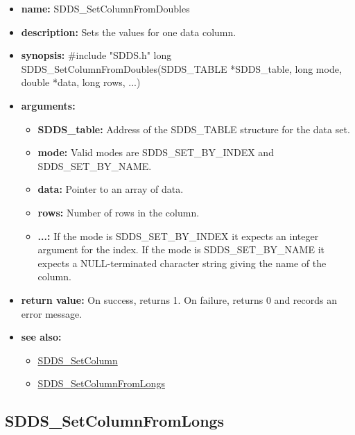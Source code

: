 \documentclass[11pt]{article}
\newcommand{\progref}[1]{\hyperref{SDDS_#1}{{\tt SDDS\_#1} (}{)}{SDDS_#1}}
\begin{document}
\begin{itemize}
\item {\bf name:}\newline
SDDS\_SetColumnFromDoubles
\item {\bf description:}\newline
Sets the values for one data column.
\item {\bf synopsis:} \#include "SDDS.h"\newline
long SDDS\_SetColumnFromDoubles(SDDS\_TABLE *SDDS\_table, long mode, double *data, long rows, ...)
\item {\bf arguments:}
\begin{itemize}
\item {\bf SDDS\_table:} Address of the SDDS\_TABLE structure for the data set.
\item {\bf mode:} Valid modes are SDDS\_SET\_BY\_INDEX and SDDS\_SET\_BY\_NAME.
\item {\bf data:} Pointer to an array of data.
\item {\bf rows:} Number of rows in the column.
\item {\bf ...:} If the mode is SDDS\_SET\_BY\_INDEX it expects an integer argument for the index. If the mode is SDDS\_SET\_BY\_NAME it expects a NULL-terminated character string giving the name of the column.
\end{itemize}
\item {\bf return value:}\newline
On success, returns 1. On failure, returns 0 and records an error message.
\item {\bf see also:}
\begin{itemize}
\item \progref{SetColumn}
\item \progref{SetColumnFromLongs}
\end{itemize}
\end{itemize}

\subsection{SDDS\_SetColumnFromLongs}
\label{SDDS_SetColumnFromLongs}
\end{document}
